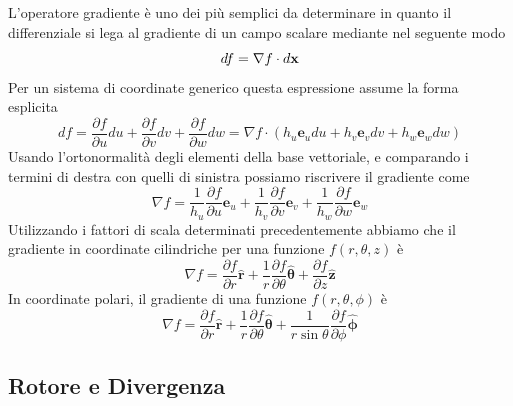 L'operatore gradiente \`e uno dei pi\`u semplici da determinare in quanto il differenziale si lega al gradiente di un campo scalare mediante nel seguente modo
\begin{equation*}
	df = \nabla f \cdot d\bold{x}
\end{equation*}
Per un sistema di coordinate generico questa espressione assume la forma esplicita
\begin{equation*}
	d f=\frac{\partial f}{\partial u} d u+\frac{\partial f}{\partial v} d v+\frac{\partial f}{\partial w} d w=\nabla f \cdot\left(h_u \mathbf{e}_u d u+h_v \mathbf{e}_v d v+h_w \mathbf{e}_w d w\right)
\end{equation*}
Usando l'ortonormalit\`a degli elementi della base vettoriale, e comparando i termini di destra con quelli di sinistra possiamo riscrivere il gradiente come 
\begin{equation}
	\nabla f=\frac{1}{h_u} \frac{\partial f}{\partial u} \mathbf{e}_u+\frac{1}{h_v} \frac{\partial f}{\partial v} \mathbf{e}_v+\frac{1}{h_w} \frac{\partial f}{\partial w} \mathbf{e}_w
\end{equation}
Utilizzando i fattori di scala determinati precedentemente abbiamo che il gradiente in coordinate cilindriche per una funzione $f(r,\theta,z)$ \`e 
\begin{equation*}
	\nabla f=\frac{\partial f}{\partial r} \hat{\boldsymbol{r}}+\frac{1}{r} \frac{\partial f}{\partial \theta} \hat{\boldsymbol{\theta}}+\frac{\partial f}{\partial z} \hat{\mathbf{z}}
\end{equation*}
In coordinate polari, il gradiente di una funzione $f(r,\theta,\phi)$ \`e 
\begin{equation*}
	\nabla f=\frac{\partial f}{\partial r} \hat{\mathbf{r}}+\frac{1}{r} \frac{\partial f}{\partial \theta} \hat{\boldsymbol{\theta}}+\frac{1}{r \sin \theta} \frac{\partial f}{\partial \phi} \hat{\boldsymbol{\phi}}
\end{equation*}
\newpage

\subsection{Rotore e Divergenza}


